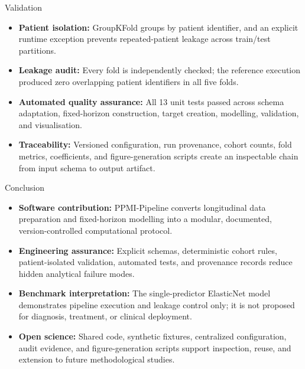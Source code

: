 \begin{frame}[t]
\begin{columns}[t]
\begin{column}{\colwidth}
\begin{block}{Validation}
\begin{itemize}
  \setlength{\itemsep}{0.35em}
  \item \textbf{Patient isolation:} GroupKFold groups by patient identifier, and an explicit runtime exception prevents repeated-patient leakage across train/test partitions.
  \item \textbf{Leakage audit:} Every fold is independently checked; the reference execution produced zero overlapping patient identifiers in all five folds.
  \item \textbf{Automated quality assurance:} All 13 unit tests passed across schema adaptation, fixed-horizon construction, target creation, modelling, validation, and visualisation.
  \item \textbf{Traceability:} Versioned configuration, run provenance, cohort counts, fold metrics, coefficients, and figure-generation scripts create an inspectable chain from input schema to output artifact.
\end{itemize}
\end{block}

\vspace{0.8cm}

\begin{block}{Conclusion}
\begin{itemize}
  \setlength{\itemsep}{0.35em}
  \item \textbf{Software contribution:} PPMI-Pipeline converts longitudinal data preparation and fixed-horizon modelling into a modular, documented, version-controlled computational protocol.
  \item \textbf{Engineering assurance:} Explicit schemas, deterministic cohort rules, patient-isolated validation, automated tests, and provenance records reduce hidden analytical failure modes.
  \item \textbf{Benchmark interpretation:} The single-predictor ElasticNet model demonstrates pipeline execution and leakage control only; it is not proposed for diagnosis, treatment, or clinical deployment.
  \item \textbf{Open science:} Shared code, synthetic fixtures, centralized configuration, audit evidence, and figure-generation scripts support inspection, reuse, and extension to future methodological studies.
\end{itemize}
\end{block}

\vspace{0.8cm}


\end{column}
\end{columns}
\end{frame}
